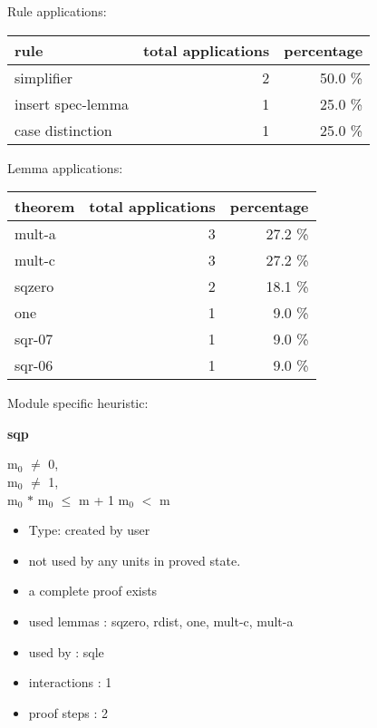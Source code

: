 \documentclass[a4paper]{article}
\begin{document}
Rule applications:

\begin{supertabular}{l|r|r}
rule	        & total applications & percentage \\ \hline
simplifier & 2 & 50.0 \% \\
insert spec-lemma & 1 & 25.0 \% \\
case distinction & 1 & 25.0 \% \\

\end{supertabular}

Lemma applications:

\begin{supertabular}{l|r|r}
theorem	        & total applications & percentage \\ \hline
mult-a & 3 & 27.2 \% \\
mult-c & 3 & 27.2 \% \\
sqzero & 2 & 18.1 \% \\
one & 1 & 9.0 \% \\
sqr-07 & 1 & 9.0 \% \\
sqr-06 & 1 & 9.0 \% \\

\end{supertabular}

Module specific heuristic:

\pagebreak

{\LARGE\bf sqp}\label{lemma-sqp}

\medskip

$\mbox{m}_{0}$ $\neq$ 0, \\
$\mbox{m}_{0}$ $\neq$ 1, \\
$\mbox{m}_{0}$ $*$ $\mbox{m}_{0}$ $\le$ m + 1 \Fol $\mbox{m}_{0}$ $<$ m

\begin{itemize}

\item Type: created by user

\item not used by any units in proved state.
\item       a complete proof exists
\item       used lemmas  : sqzero, rdist, one, mult-c, mult-a
\item       used by      : sqle
\item       interactions : 1
\item       proof steps  : 2
\end{itemize}

\medskip
\end{document}
